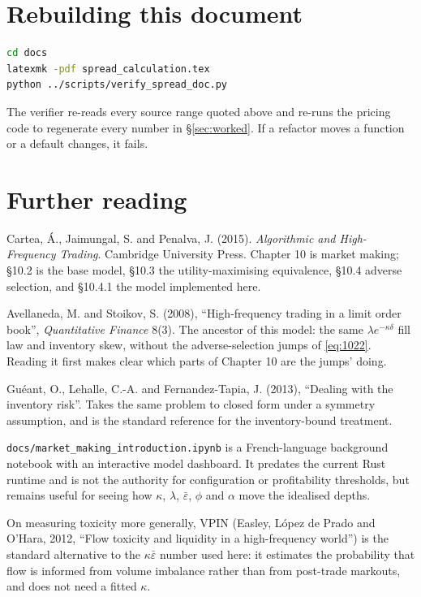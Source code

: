 \documentclass[11pt,a4paper]{article}
\newcommand{\epsb}{\bar{\varepsilon}}
\newcommand{\code}[1]{\texttt{\small #1}}
\begin{document}
\section{Rebuilding this document}

\begin{lstlisting}[language=bash]
cd docs
latexmk -pdf spread_calculation.tex
python ../scripts/verify_spread_doc.py
\end{lstlisting}

The verifier re-reads every source range quoted above and re-runs the pricing
code to regenerate every number in \S\ref{sec:worked}. If a refactor moves a
function or a default changes, it fails.

\section{Further reading}

Cartea, \'A., Jaimungal, S. and Penalva, J. (2015). \emph{Algorithmic and
High-Frequency Trading}. Cambridge University Press. Chapter 10 is market
making; \S10.2 is the base model, \S10.3 the utility-maximising equivalence,
\S10.4 adverse selection, and \S10.4.1 the model implemented here.

Avellaneda, M. and Stoikov, S. (2008), ``High-frequency trading in a limit order
book'', \emph{Quantitative Finance} 8(3). The ancestor of this model: the same
$\lambda e^{-\kappa\delta}$ fill law and inventory skew, without the
adverse-selection jumps of \eqref{eq:1022}. Reading it first makes clear which
parts of Chapter 10 are the jumps' doing.

Guéant, O., Lehalle, C.-A. and Fernandez-Tapia, J. (2013), ``Dealing with the
inventory risk''. Takes the same problem to closed form under a symmetry
assumption, and is the standard reference for the inventory-bound treatment.

\code{docs/market\_making\_introduction.ipynb} is a French-language background
notebook with an interactive model dashboard. It predates the current Rust
runtime and is not the authority for configuration or profitability thresholds,
but remains useful for seeing how $\kappa$, $\lambda$, $\epsb$, $\phi$ and
$\alpha$ move the idealised depths.

On measuring toxicity more generally, VPIN (Easley, L\'opez de Prado and O'Hara,
2012, ``Flow toxicity and liquidity in a high-frequency world'') is the standard
alternative to the $\kappa\epsb$ number used here: it estimates the probability
that flow is informed from volume imbalance rather than from post-trade markouts,
and does not need a fitted $\kappa$.
\end{document}
